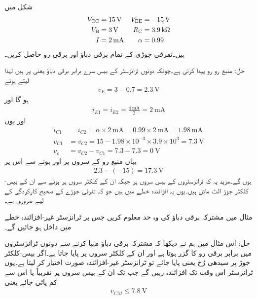  
شکل  میں 
\begin{align*}
V_{\textup{CC}} &=\SI{+15}{\volt} & V_{\textup{EE}} &=\SI{-15}{\volt} \\
V_{\textup{B}} &=\SI{3}{\volt} &  R_{\textup{C}} &=\SI{3.9}{\kilo \ohm}\\
I &=\SI{2}{\milli \ampere} & \alpha &=\num{0.99}
\end{align*}
ہیں۔تفرقی جوڑی کے تمام برقی دباؤ اور برقی رو حاصل کریں۔

حل:	منبع رو  رو پیدا کرتی ہے۔چونکہ دونوں ٹرانزسٹر کے بیس  سرے برابر برقی دباؤ یعنی   پر ہیں لہٰذا   لیتے ہوئے
\begin{align*}
v_E=3-0.7=\SI{2.3}{\volt}
\end{align*}
ہو گا اور
\begin{align*}
i_{E1}=i_{E2}=\frac{\SI{4}{\milli \ampere}}{2}=\SI{2}{\milli \ampere}
\end{align*}
اور یوں
\begin{align*}
i_{C1}&=i_{C2}=\alpha \times \SI{2}{\milli \ampere}=0.99 \times \SI{2}{\milli \ampere}=\SI{1.98}{\milli \ampere}\\
v_{C1}&=v_{C2}=15-1.98\times 10^{-3} \times 3.9 \times 10^3=\SI{7.3}{\volt}\\
v_o&=v_{C2}-v_{C1}=7.3-7.3=\SI{0}{\volt}
\end{align*}
یہاں منبع رو کے سروں پر   اور  ہونے سے اس پر 
\begin{align*}
2.3-(-15)=\SI{17.3}{\volt}
\end{align*}
ہوں گے۔مزید یہ کہ ٹرانزسٹروں کے بیس  سروں پر  جبکہ ان کے کلکٹر سروں پر  ہونے سے ان کے بیس-کلکٹر  جوڑ الٹ مائل ہیں۔یوں یہ افزائندہ خطے میں ہیں جو کہ تفرقی جوڑے کے صحیح کارکردگی کے لیے ضروری ہے۔


مثال   میں مشترکہ برقی دباؤ کی وہ حد معلوم کریں جس پر ٹرانزسٹر غیر-افزائندہ خطے میں داخل ہو جائیں گے۔

حل:	اس مثال میں ہم نے دیکھا کہ مشترکہ برقی دباؤ مہیا کرنے سے دونوں ٹرانزسٹروں میں برابر برقی رو کا گزر ہوتا ہے اور ان کے کلکٹر سروں پر  پایا جاتا ہے۔اگر بیس-کلکٹر  جوڑ پر سیدھی رُخ  یعنی  پایا جائے تو ٹرانزسٹر غیر-افزائندہ صورت اختیار کر لیتا ہے۔یوں ٹرانزسٹر اس وقت تک افزائندہ رہیں گے جب تک ان کے بیس  سروں پر تقریباً  یا اس سے کم  پائی جائے  یعنی
\begin{align*}
v_{CM}\le \SI{7.8}{\volt}
\end{align*}

